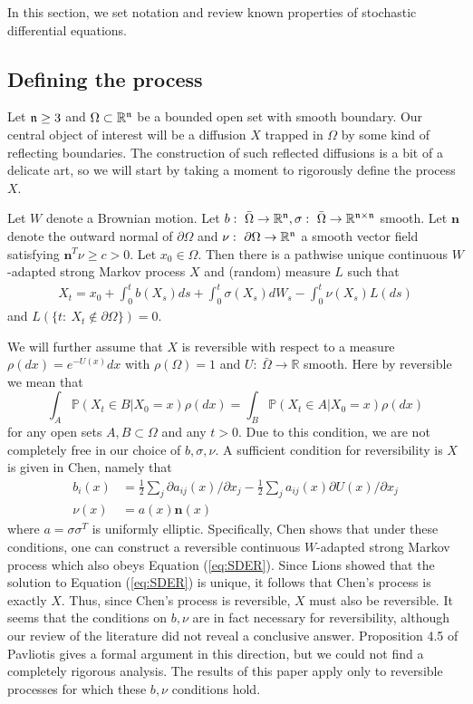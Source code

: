 \documentclass[english, aip, jcp, priprint, graphicx,floatfix]{revtex4-1}
\theoremstyle{plain}
\theoremstyle{definition}
\theoremstyle{plain}
\begin{document}
In this section, we set notation and review known properties of stochastic differential equations.   

\subsection{Defining the process}

Let ${\mathfrak{n}} \geq 3$ and $\Omega \subset \mathbb{R}^{\mathfrak{n}}$ be a bounded open set with smooth boundary.  Our central object of interest will be a diffusion $X$ trapped in $\Omega$ by some kind of reflecting boundaries.  The construction of such reflected diffusions is a bit of a delicate art, so we will start by taking a moment to rigorously define the process $X$.

Let $W$ denote a Brownian motion.  Let $b:\ \bar \Omega \rightarrow \mathbb{R}^{\mathfrak{n}},\sigma:\ \bar \Omega \rightarrow \mathbb{R}^{{\mathfrak{n}}\times{\mathfrak{n}}}$ smooth.  Let $\mathbf{n}$ denote the outward normal of $\partial \Omega$ and $\nu:\ \partial \Omega \rightarrow \mathbb{R}^{\mathfrak{n}}$ a smooth vector field satisfying $\mathbf{n}^T\nu\geq c>0$. Let $x_0 \in \Omega$.  Then there is a pathwise unique continuous $W$-adapted strong Markov process $X$ and (random) measure $L$ such that 
\begin{gather}\label{eq:SDER}
X_t = x_0 + \int_0^t b(X_s)ds + \int_0^t \sigma(X_s)dW_s - \int_0^t \nu(X_s) L(ds)
\end{gather}
and $L(\{t:\ X_t \notin \partial \Omega\})=0$.\cite{lions1984stochastic} 

We will further assume that $X$ is reversible with respect to a measure $\rho(dx)=e^{-U(x)}dx$ with $\rho(\Omega)=1$ and $U:\ \bar \Omega \rightarrow \mathbb{R}$ smooth.  Here by reversible we mean that
\[
\int_{A}\mathbb{P}(X_{t}\in B|X_{0}=x)\rho(dx)  =\int_{B}\mathbb{P}(X_{t}\in A|X_{0}=x)\rho(dx)
\]
for any open sets $A,B\subset \Omega$ and any $t>0$.  Due to this condition, we are not completely free in our choice of $b,\sigma,\nu$.  A sufficient condition for reversibility is $X$ is given in Chen,\cite{chen1993reflecting} namely that
\begin{align*}
b_i(x)&=\frac{1}{2} \sum_j \partial a_{ij}(x)/\partial x_j - \frac{1}{2}\sum_j a_{ij}(x) \partial U(x)/\partial x_j \\
\nu(x)&= a(x) \mathbf{n}(x)
\end{align*}
where $a=\sigma\sigma^T$ is uniformly elliptic.  Specifically, Chen shows that under these conditions, one can construct a reversible continuous $W$-adapted strong Markov process which also obeys Equation (\ref{eq:SDER}).  Since Lions\cite{lions1984stochastic} showed that the solution to Equation (\ref{eq:SDER}) is unique, it follows that Chen's process is exactly $X$.  Thus, since Chen's process is reversible, $X$ must also be reversible.  It seems that the conditions on $b,\nu$ are in fact necessary for reversibility, although our review of the literature did not reveal a conclusive answer.  Proposition 4.5 of Pavliotis\cite{Pavliotis2016-xn} gives a formal argument in this direction, but we could not find a completely rigorous analysis.  The results of this paper apply only to reversible processes for which these $b,\nu$ conditions hold.
\end{document}
